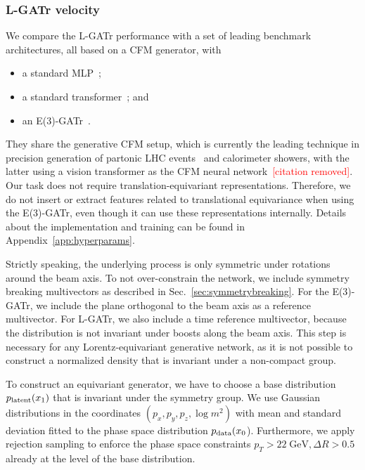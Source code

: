\documentclass[submission, Phys]{SciPost}
\begin{document}
\subsubsection*{L-GATr velocity}

We compare the L-GATr performance with a set of leading benchmark architectures, all based on a CFM generator, with
%
\begin{itemize}
\item a standard MLP~\cite{Butter:2023fov};
\item a standard transformer~\cite{Huetsch:2024quz}; and
\item an E(3)-GATr~\cite{brehmer2023geometric}.
\end{itemize}
%
They share the generative CFM setup, which is currently the leading technique in precision generation of partonic LHC events~\cite{Butter:2023fov} and calorimeter showers, with the latter using a vision transformer as the CFM neural network\textcolor{red}{~[citation removed]}. Our task does not require translation-equivariant representations. Therefore, we do not insert or extract features related to translational equivariance when using the E(3)-GATr, even though it can use these representations internally. Details about the implementation and training can be found in Appendix~\ref{app:hyperparams}.

Strictly speaking, the underlying process is only symmetric under rotations around the beam axis. To not over-constrain the network, we include symmetry breaking multivectors as described in Sec.~\ref{sec:symmetrybreaking}. For the E(3)-GATr, we include the plane orthogonal to the beam axis as a reference multivector. For L-GATr, we also include a time reference multivector, because the distribution is not invariant under boosts along the beam axis. This step is necessary for any Lorentz-equivariant generative network, as it is not possible to construct a normalized density that is invariant under a non-compact group. 

To construct an equivariant generator, we have to choose a base distribution $p_\text{latent} (x_1)$ that is invariant under the symmetry group. We use Gaussian distributions in the coordinates $(p_x, p_y, p_z, \log m^2)$ with mean and standard deviation fitted to the phase space distribution $p_\text{data} (x_0$). Furthermore, we apply rejection sampling to enforce the phase space constraints $p_T>22\;\mathrm{GeV}, \Delta R > 0.5$ already at the level of the base distribution. 
\end{document}
